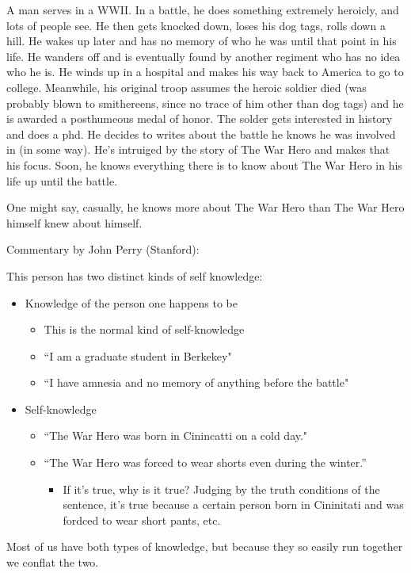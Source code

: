 A man serves in a WWII. In a battle, he does something extremely heroicly, and lots of people see. He then gets knocked down, loses his dog tags, rolls down a hill. He wakes up later and has no memory of who he was until that point in his life. He wanders off and is eventually found by another regiment who has no idea who he is. He winds up in a hospital and makes his way back to America to go to college. Meanwhile, his original troop assumes the heroic soldier died (was probably blown to smithereens, since no trace of him other than dog tags) and he is awarded a posthumeous medal of honor. The solder gets interested in history and does a phd. He decides to writes about the battle he knows he was involved in (in some way). He's intruiged by the story of The War Hero and makes that his focus. Soon, he knows everything there is to know about The War Hero in his life up until the battle. \cite{castaneda1968logic}

One might say, casually, he knows more about The War Hero than The War Hero himself knew about himself.

Commentary by John Perry (Stanford):

This person has two distinct kinds of self knowledge:

\begin{itemize}
    \item Knowledge of the person one happens to be
    \begin{itemize}
        \item This is the normal kind of self-knowledge
        \item ``I am a graduate student in Berkekey"
        \item ``I have amnesia and no memory of anything before the battle"
    \end{itemize}
    \item Self-knowledge
    \begin{itemize}
        \item ``The War Hero was born in Cinincatti on a cold day."
        \item ``The War Hero was forced to wear shorts even during the winter.''
        \begin{itemize}
            \item If it's true, why is it true? Judging by the truth conditions of the sentence, it's true because a certain person born in Cininitati and was fordced to wear short pants, etc.
        \end{itemize}
    \end{itemize}
\end{itemize}

Most of us have both types of knowledge, but because they so easily run together we conflat the two.

